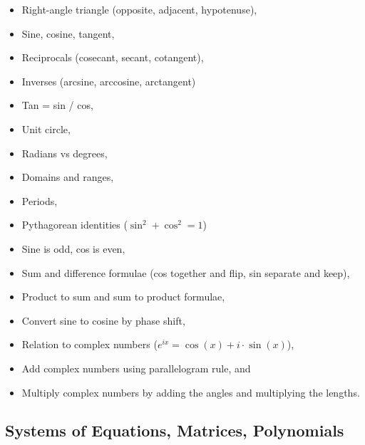 \begin{itemize}
  \begin{itemize}
  \tightlist
  \item
    Right-angle triangle (opposite, adjacent, hypotenuse),
  \item
    Sine, cosine, tangent,
  \item
    Reciprocals (cosecant, secant, cotangent),
  \item
    Inverses (arcsine, arccosine, arctangent)
  \item
    Tan = sin / cos,
  \item
    Unit circle,
  \item
    Radians vs degrees,
  \item
    Domains and ranges,
  \item
    Periods,
  \item
    Pythagorean identities (\(\sin^2 + \cos^2 = 1\))
  \item
    Sine is odd, cos is even,
  \item
    Sum and difference formulae (cos together and flip, sin separate and
    keep),
  \item
    Product to sum and sum to product formulae,
  \item
    Convert sine to cosine by phase shift,
  \item
    Relation to complex numbers
    (\(e^{ix} = \cos(x) + i \cdot \sin(x)\)),
  \item
    Add complex numbers using parallelogram rule, and
  \item
    Multiply complex numbers by adding the angles and multiplying the
    lengths.
  \end{itemize}
\end{itemize}

\hypertarget{systems-of-equations-matrices-polynomials}{%
\subsection{Systems of Equations, Matrices,
Polynomials}\label{systems-of-equations-matrices-polynomials}}

